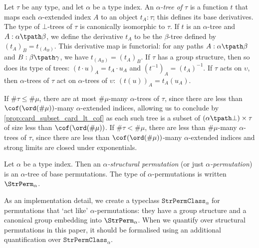 \begin{definition}[tree]
  \label{def:Tree}
  \leanok
  Let \( \tau \) be any type, and let \( \alpha \) be a type index.
  An \emph{\( \alpha \)-tree of \( \tau \)} is a function \( t \) that maps each \( \alpha \)-extended index \( A \) to an object \( t_A : \tau \); this defines its base derivatives.
  The type of \( \bot \)-trees of \( \tau \) is canonically isomorphic to \( \tau \).
  If \( t \) is an \( \alpha \)-tree and \( A : \alpha \tpath \beta \), we define the derivative \( t_A \) to be the \( \beta \)-tree defined by \( (t_A)_B = t_{(A_B)} \).
  This derivative map is functorial: for any paths \( A : \alpha \tpath \beta \) and \( B : \beta \tpath \gamma \), we have \( t_{(A_B)} = (t_A)_B \).
  If \( \tau \) has a group structure, then so does its type of trees: \( (t \cdot u)_A = t_A \cdot u_A \) and \( (t^{-1})_A = (t_A)^{-1} \).
  If \( \tau \) acts on \( \upsilon \), then \( \alpha \)-trees of \( \tau \) act on \( \alpha \)-trees of \( \upsilon \): \( (t(u))_A = t_A(u_A) \).

  If \( \#\tau \leq \#\mu \), there are at most \( \#\mu \)-many \( \alpha \)-trees of \( \tau \), since there are less than \( \cof(\ord(\#\mu)) \)-many \( \alpha \)-extended indices, allowing us to conclude by \cref{prop:card_subset_card_lt_cof} as each such tree is a subset of \( (\alpha \tpath \bot) \times \tau \) of size less than \( \cof(\ord(\#\mu)) \).
  If \( \#\tau < \#\mu \), there are less than \( \#\mu \)-many \( \alpha \)-trees of \( \tau \), since there are less than \( \cof(\ord(\#\mu)) \)-many \( \alpha \)-extended indices and strong limits are closed under exponentials.
\end{definition}
\begin{definition}
  \label{def:StrPerm}
  \leanok
  Let \( \alpha \) be a type index.
  Then an \emph{\( \alpha \)-structural permutation} (or just \emph{\( \alpha \)-permutation}) is an \( \alpha \)-tree of base permutations.
  The type of \( \alpha \)-permutations is written \( \StrPerm_\alpha \).
\end{definition}
As an implementation detail, we create a typeclass \( \texttt{StrPermClass}_\alpha \) for permutations that `act like' \( \alpha \)-permutations: they have a group structure and a canonical group embedding into \( \StrPerm_\alpha \).
When we quantify over structural permutations in this paper, it should be formalised using an additional quantification over \( \texttt{StrPermClass}_\alpha \).
